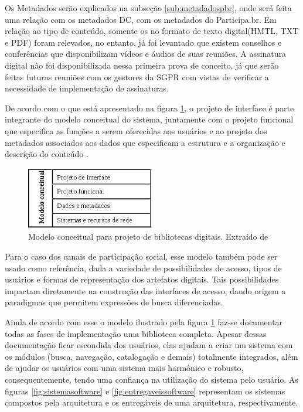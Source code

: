 Os Metadados serão explicados na subseção \ref{sub:metadadospbr}, onde será feita uma relação com os metadados DC, com os metadados do Participa.br. Em relação ao tipo de conteúdo, somente os no formato de texto digital(HMTL, TXT e PDF) foram relevados, no entanto, já foi levantado que existem conselhos e conferências que disponibilizam vídeos e áudios de suas reuniões. A assinatura digital não foi disponibilizada nessa primeira prova de conceito, já que serão feitas futuras reuniões com os gestores da SGPR com vistas de verificar a necessidade de implementação de assinaturas.

De acordo com o que está apresentado na figura \ref{fig:modelbibdigital}, o projeto de interface é parte integrante do modelo conceitual do sistema, juntamente com o projeto funcional que especifica as funções a serem oferecidas aos usuários e ao projeto dos metadados associados aos dados que especificam a estrutura e a organização e descrição do conteúdo \cite[pp. 143--145]{arms2000digital}\cite[pp. 190]{ferreira2006interface}.

\graphicspath{{figuras/}}
\begin{figure}[H]
\centering
\includegraphics[width=0.5\textwidth]{modelo_biblioteca}
\caption[Modelo conceitual para projeto de bibliotecas digitais]{Modelo conceitual para projeto de bibliotecas digitais. Extraído de \cite[p. 144]{arms2000digital}}
\label{fig:modelbibdigital}
\end{figure}

Para o caso dos canais de participação social, esse modelo também pode ser usado como referência, dada a variedade de possibilidades de acesso, tipos de usuários e formas de representação dos artefatos digitais. Tais possibilidades impactam diretamente na construção das interfaces de acesso, dando origem a paradigmas que permitem expressões de busca diferenciadas.

Ainda de acordo com esse o modelo ilustrado pela figura \ref{fig:modelbibdigital} faz-se documentar todas as fases de implementação uma biblioteca completa. Apesar dessas documentação ficar escondida dos usuários, elas ajudam a criar um sistema com os módulos (busca, navegação, catalogação e demais) totalmente integrados, além de ajudar os usuários com uma sistema mais harmônico e robusto, consequentemente, tendo uma confiança na utilização do sistema pelo usuário. As figuras \ref{fig:sistemasoftware}  e \ref{fig:entregaveissoftware} representam os sistemas compostos pela arquitetura e os entregáveis de uma arquitetura, respectivamente.

